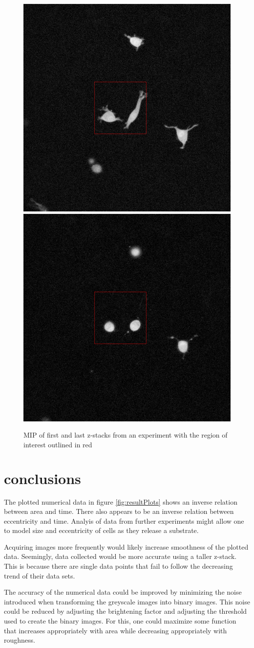 \documentclass[ twocolumn,notitlepage]{ revtex4-1}
\begin{document}
\begin{figure}[h!]
\includegraphics[width=.2\textwidth]{img/0-first-full.png}
\includegraphics[width=.2\textwidth]{img/0-last-full.png}
\caption{\label{fig:0-full}MIP of first and last z-stacks from an experiment with the region of interest outlined in red}
\end{figure}

\section*{conclusions}
The plotted numerical data in figure \ref{fig:resultPlots} shows an inverse relation between area and time. There also appears to be an inverse relation between eccentricity and time. Analyis of data from further experiments might allow one to model size and eccentricity of cells as they release a substrate.

Acquiring images more frequently would likely increase smoothness of the plotted data. Seemingly, data collected would be more accurate using a taller z-stack. This is because there are single data points that fail to follow the decreasing trend of their data sets.

The accuracy of the numerical data could be improved by minimizing the noise introduced when transforming the greyscale images into binary images. This noise could be reduced by adjusting the brightening factor and adjusting the threshold used to create the binary images. For this, one could maximize some function that increases appropriately with area while decreasing appropriately with roughness.

\end{document}
